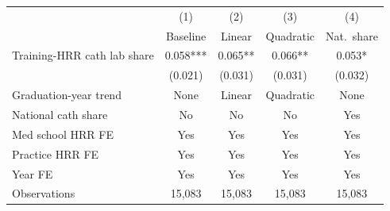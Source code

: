 \begin{tabular}{lcccc}
\toprule
 & (1) & (2) & (3) & (4) \\
 & Baseline & Linear & Quadratic & Nat.\ share \\
\midrule
Training-HRR cath lab share & 0.058*** & 0.065** & 0.066** & 0.053* \\
 & (0.021) & (0.031) & (0.031) & (0.032) \\
\midrule
Graduation-year trend & None & Linear & Quadratic & None \\
National cath share & No & No & No & Yes \\
Med school HRR FE & Yes & Yes & Yes & Yes \\
Practice HRR FE & Yes & Yes & Yes & Yes \\
Year FE & Yes & Yes & Yes & Yes \\
Observations & 15,083 & 15,083 & 15,083 & 15,083 \\
\bottomrule
\end{tabular}

